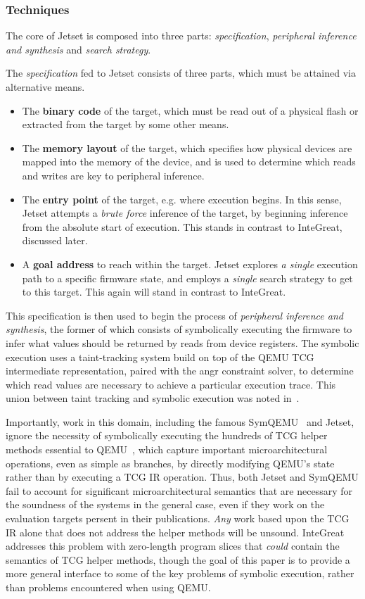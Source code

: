 \subsubsection{Techniques}

The core of Jetset is composed into three parts: \emph{specification}, \emph{peripheral inference and synthesis} and \emph{search strategy}. 

The \emph{specification} fed to Jetset consists of three parts, which must be attained via alternative means.
\begin{itemize}
	\item The \textbf{binary code} of the target, which must be read out of a physical flash or extracted from the target by some other means.
	\item The \textbf{memory layout} of the target, which specifies how physical devices are mapped into the memory of the device, and is used to determine which reads and writes are key to peripheral inference.
	\item The \textbf{entry point} of the target, e.g. where execution begins. In this sense, Jetset attempts a \emph{brute force} inference of the target, by beginning inference from the absolute start of execution. This stands in contrast to InteGreat, discussed later.
	\item A \textbf{goal address} to reach within the target. Jetset explores \emph{a single} execution path to a specific firmware state, and employs a \emph{single} search strategy to get to this target. This again will stand in contrast to InteGreat.
\end{itemize}

This specification is then used to begin the process of \emph{peripheral inference and synthesis}, the former of which consists of symbolically executing the firmware to infer what values should be returned by reads from device registers.
The symbolic execution uses a taint-tracking system build on top of the QEMU TCG intermediate representation, paired with the angr constraint solver, to determine which read values are necessary to achieve a particular execution trace.
This union between taint tracking and symbolic execution was noted in~\cite{schwartz2010all}.

Importantly, work in this domain, including the famous SymQEMU~\cite{poeplau2021symqemu} and Jetset, ignore the necessity of symbolically executing the hundreds of TCG helper methods essential to QEMU~\cite{tcghelper}, which capture important microarchitectural operations, even as simple as branches, by directly modifying QEMU's state rather than by executing a TCG IR operation.
Thus, both Jetset and SymQEMU fail to account for significant microarchitectural semantics that are necessary for the soundness of the systems in the general case, even if they work on the evaluation targets persent in their publications.
\emph{Any} work based upon the TCG IR alone that does not address the helper methods will be unsound.
InteGreat addresses this problem with zero-length program slices that \emph{could} contain the semantics of TCG helper methods, though the goal of this paper is to provide a more general interface to some of the key problems of symbolic execution, rather than problems encountered when using QEMU.

